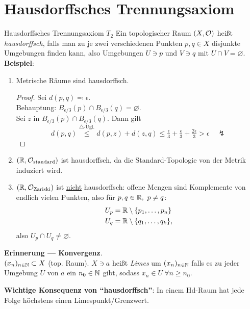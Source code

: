 \section{Hausdorffsches Trennungsaxiom}
\begin{bla}{Hausdorffsches Trennungsaxiom $ T_2 $}
  Ein topologischer Raum $ (X,\mathcal{O}) $ heißt \emph{hausdorffsch}, falls man zu je zwei verschiedenen Punkten $ p,q \in X $ disjunkte Umgebungen finden kann, also Umgebungen $ U \ni p $ und $ V \ni q $ mit $ U \cap V = \varnothing $. \\
  \textbf{Beispiel}:
  \begin{enumerate}
    \item Metrische Räume sind hausdorffsch.
    \begin{proof}
       Sei $ d(p,q) \eqqcolon \epsilon $. \\
       Behauptung: $ B_{\epsilon/3}(p) \cap B_{\epsilon/3}(q) = \varnothing $. \\
       Sei $ z $ in $ B_{\epsilon/3}(p) \cap B_{\epsilon/3}(q) $. Dann gilt
       \begin{equation*}
         d(p,q) \overset{\triangle\text{-Ugl.}}{\leq} d(p,z)+d(z,q) \leq \tfrac{\epsilon}{3} + \tfrac{\epsilon}{3} + \tfrac{2\epsilon}{3} > \epsilon \quad \lightning
       \end{equation*}
     \end{proof} 
    \item $ (\mathbb{R}, \mathcal{O}_\text{standard}) $ ist hausdorffsch, da die Standard-Topologie von der Metrik induziert wird.
    \item $ (\mathbb{R}, \mathcal{O}_\text{Zariski}) $ ist \underline{nicht} hausdorffsch: offene Mengen sind Komplemente von endlich vielen Punkten, also für $ p, q \in \mathbb{R}, \ p \neq q $:
    \begin{align*}
      U_p &= \mathbb{R} \setminus \{ p_1, \dots, p_n \} \\
      U_q &= \mathbb{R} \setminus \{ q_1, \dots, q_k \}\text{,}
    \end{align*}
    also $ U_p \cap U_q \neq \varnothing $.
  \end{enumerate}
  \begin{marginfigure}
    \textbf{Erinnerung --- Konvergenz}. \\
    $ (x_n)_{n \in \mathbb{N}} \subset X $ (top. Raum). $ X \ni a $ heißt \emph{Limes} um $ (x_n)_{n \in \mathbb{N}} $ falls es zu jeder Umgebung $ U $ von $ a $ ein $ n_0 \in \mathbb{N} $ gibt, sodass $ x_n \in U \ \forall n \geq n_0 $.
  \end{marginfigure}
  \textbf{Wichtige Konsequenz von ``hausdorffsch''}: In einem Hd-Raum hat jede Folge höchstens einen Limespunkt/Grenzwert.
\end{bla}

